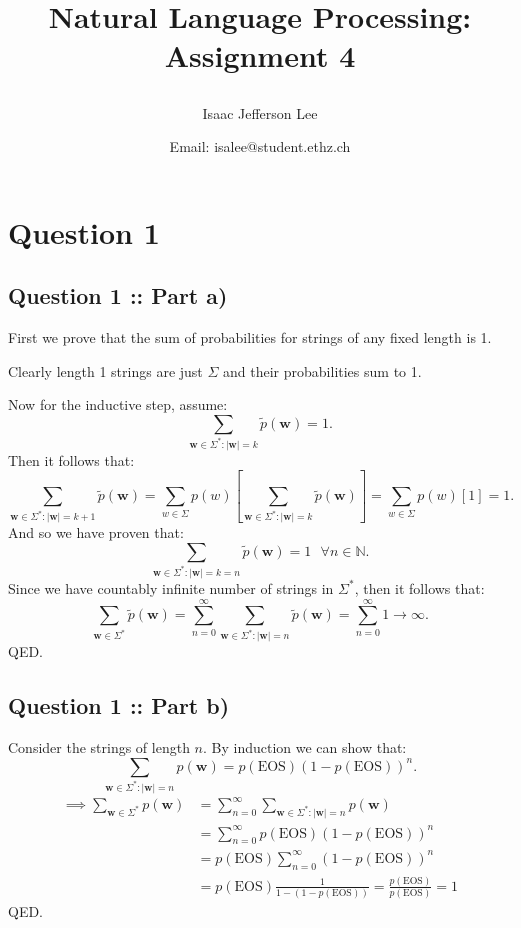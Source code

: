 \documentclass[a4paper]{article}
\title{Natural Language Processing: Assignment 4\author{Isaac Jefferson Lee}\date{Email: isalee@student.ethz.ch}}
\begin{document}
\maketitle
\thispagestyle{fancy} 

\section*{Question 1}

\subsection*{Question 1 :: Part a)}
First we prove that the sum of probabilities for strings of any fixed
length is 1.

Clearly length 1 strings are just $\Sigma$ and their probabilities sum to 1.

Now for the inductive step, assume:
\[
\sum_{\bm{w} \in \Sigma^* : |\bm{w}|=k} \tilde{p}(\bm{w}) = 1
.\]
Then it follows that:
\[
    \sum_{\bm{w} \in \Sigma^* : |\bm{w}|=k+1} \tilde{p}(\bm{w}) = \sum_{w \in \Sigma} p(w)\left[ \sum_{\bm{w} \in \Sigma^* : |\bm{w}|=k} \tilde{p}(\bm{w})  \right] = \sum_{w \in \Sigma} p(w)[1] = 1
.\]
And so we have proven that:
\[
\sum_{\bm{w} \in \Sigma^* : |\bm{w}|=k=n} \tilde{p}(\bm{w}) = 1 ~ ~ ~\forall n \in \mathbb{N}
.\]
Since we have countably infinite number of strings in $\Sigma^*$, then it follows that:
\[
    \sum_{\bm{w} \in \Sigma^*} \tilde{p}(\bm{w}) = \sum_{n=0}^{\infty} \sum_{\bm{w} \in \Sigma^* : |\bm{w}|=n} \tilde{p}(\bm{w}) = \sum_{n=0}^{\infty} 1 \to \infty
.\]
QED.


\subsection*{Question 1 :: Part b)}
Consider the strings of length $n$.
By induction we can show that:
\[
\sum_{\bm{w} \in \Sigma^* : |\bm{w}|=n} p(\bm{w}) = p(\text{EOS})(1-p(\text{EOS}))^n
.\]
\begin{align*}
     \implies \sum_{\bm{w} \in \Sigma^*} p(\bm{w}) &=  \sum_{n=0}^{\infty} \sum_{\bm{w} \in \Sigma^* : |\bm{w}|=n} p(\bm{w}) \\
                                                   &=  \sum_{n=0}^{\infty} p(\text{EOS})(1-p(\text{EOS}))^n\\ 
 &=  p(\text{EOS}) \sum_{n=0}^{\infty} (1-p(\text{EOS}))^n\\ 
 &=  p(\text{EOS}) \frac{1}{1 - (1 - p(\text{EOS}))} =  \frac{p(\text{EOS})}{p(\text{EOS})} =  1
\end{align*}
QED.
\end{document}
